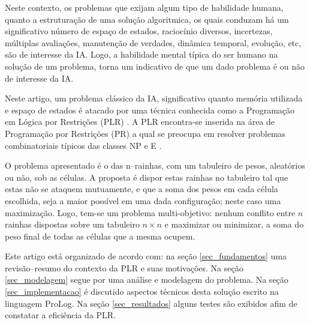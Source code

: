 \documentclass[12pt]{article}
\theoremstyle{definition}
\begin{document}
Neste contexto, os problemas que exijam algum tipo de habilidade humana, quanto a estruturação
de uma solução algoritmica,  os quais conduzam há um significativo 
 número de espaço de estados,  raciocínio diversos, incertezas, múltiplas avaliações, manutenção de
verdades, dinâmica temporal,  evolução, etc, são de interesse da IA.
Logo, a habilidade mental  típica do ser humano na solução de um problema, torna um indicativo de que um dado problema  é ou não de interesse da IA. 

\begin{comment}
Por outro lado, uma simples 
 ameba\footnote{A ameba é um animal unicelular, 
composto por apenas uma única célula. Em função do seu tamanho, em média 
0,2 milímetro, é observável apenas com a ajuda de  microscópio. A ameba é classificada  como protozoário e sua vida remonta o período de origem do nosso planeta.}
 biológica  apresenta
um elevado grau de adaptação ao meio ambiente visando a sua sobrevivência, apresenta
características intrínsecas de um ser inteligente.
, estático
\end{comment}

Neste artigo, um  problema clássico da IA, significativo quanto
memória utilizada e  espaço de estados é atacado por uma técnica conhecida 
como a Programação em Lógica por Restrições (PLR) \cite{JAFFAR87}. A PLR encontra-se inserida na área de Programação por Restrições (PR) \cite{apt_2003} a qual se preocupa em resolver problemas combinatoriais típicos das classes NP e E \cite{rossi2006,rina2003}.


O problema apresentado é o das n--rainhas, com um tabuleiro de 
pesos, aleatórios ou não, sob as células. A proposta é dispor estas rainhas no tabuleiro tal que
estas não se ataquem mutuamente, e que a soma dos pesos em cada
célula escolhida, seja a maior possível em uma dada configuração; neste caso uma maximização.  Logo, tem-se
um problema multi-objetivo: nenhum conflito entre $n$ rainhas dispostas sobre um
 tabuleiro $n \times n$ e 
 maximizar ou minimizar,  a soma do peso final de todas as células que a mesma ocupem.

Este artigo está organizado de acordo com: na seção \ref{sec_fundamentos}
 uma revisão--resumo do contexto da PLR e suas
 motivações. Na seção \ref{sec_modelagem} segue por uma análise e modelagem
 do problema. Na seção \ref{sec_implementacao} é discutido aspectos
técnicos desta solução escrito na linguagem ProLog. Na seção \ref{sec_resultados}
alguns testes são exibidos afim de constatar a eficiência da PLR.
\end{document}
